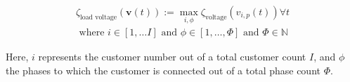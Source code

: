 \begin{equation}
\begin{split}
	\zeta_\text{load voltage}(\textbf{v}(t)) := \max_{i,\phi}{\zeta_\text{voltage}(v_{i,p}(t))} \forall t \\
	\text{ where } i \in [1, \dots I] \text{ and } \phi \in [1, \dots, \Phi] \text{ and } \Phi \in \mathbb{N}
\end{split}
\label{ch1:equ:load-voltage-deviation}
\end{equation}

Here, $i$ represents the customer number out of a total customer count $I$, and $\phi$ the phases to which the customer is connected out of a total phase count $\Phi$.